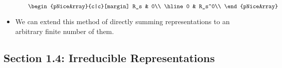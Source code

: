 \documentclass[../notes.tex]{subfiles}
\begin{document}
\begin{itemize}
\begin{itemize}
        \begin{equation*}
            \renewcommand{\arraystretch}{1.2}
            \begin{pNiceArray}{c|c}[margin]
                R_s & 0\\
                \hline
                0 & R_s^0\\
            \end{pNiceArray}
        \end{equation*}
    \end{itemize}
    \item We can extend this method of directly summing representations to an arbitrary finite number of them.
\end{itemize}



\subsection*{Section 1.4: Irreducible Representations}
\end{document}
